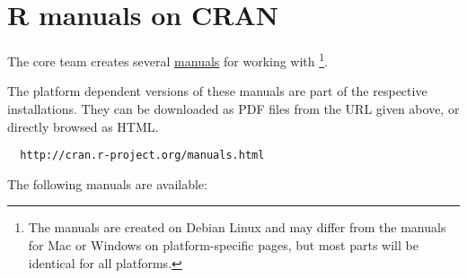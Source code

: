 
\chapter{R manuals on CRAN}


The \RR{} core team creates several
\href{http://cran.r-project.org/manuals.html}{manuals}
for working with \RR{}\footnote{
  The manuals are created on Debian Linux and may differ from the manuals for Mac
  or Windows on platform-specific pages, but most parts will be identical for
  all platforms.}.


The platform dependent versions of these manuals are part of the respective
\RR{} installations. They can be downloaded as PDF files from the URL given
above, or directly browsed as HTML.

\begin{verbatim}
  http://cran.r-project.org/manuals.html
\end{verbatim}


The following manuals are available:



